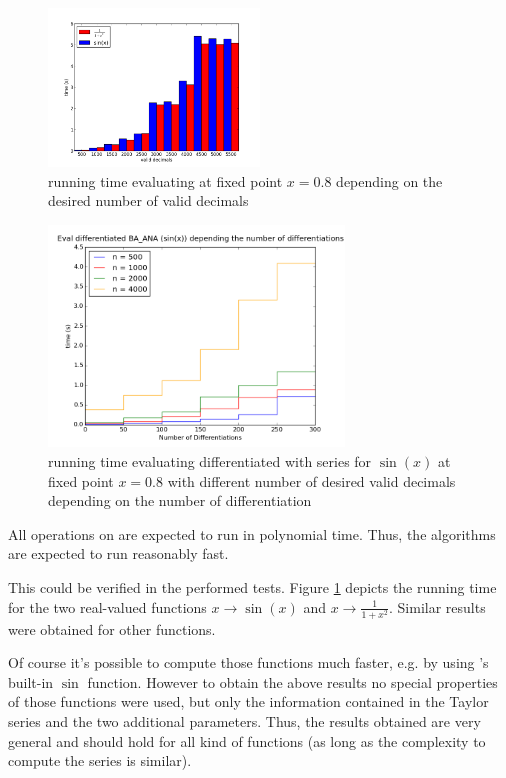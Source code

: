 			\begin{figure}[h]
				\centering
				\includegraphics[width=0.5\textwidth]{img/analytic/ba_ana_dep_on_n_bar.png}
				\caption{running time evaluating \baana at fixed point $x=0.8$ depending on the desired number of valid decimals}
				\label{fig:ba_ana dep on n}
			\end{figure}
			\begin{figure}[h]
				\centering
				\includegraphics[width=0.7\textwidth]{img/analytic/ba_ana_dep_on_diff_sin.png}
				\caption{running time evaluating differentiated \baana with series for $\sin(x)$ at fixed point $x=0.8$ with different number
        of desired valid decimals depending on the number of differentiation}
				\label{fig:ba_ana dep on differentiation}
			\end{figure}
      All operations on \baana are expected to run in polynomial time.
      Thus, the algorithms are expected to run reasonably fast.

      This could be verified in the performed tests. 
      Figure \ref{fig:ba_ana dep on n} depicts the running time for the two real-valued functions $x \to \sin(x)$ and $x \to \frac{1}{1+x^2}$.
      Similar results were obtained for other functions.

      Of course it's possible to compute those functions much faster, e.g. by using {\irram}'s built-in $\sin$ function.
      However to obtain the above results no special properties of those functions were used, but only the information 
      contained in the Taylor series and the two additional parameters.
      Thus, the results obtained are very general and should hold for all kind of functions (as long as the complexity to compute
      the series is similar).

